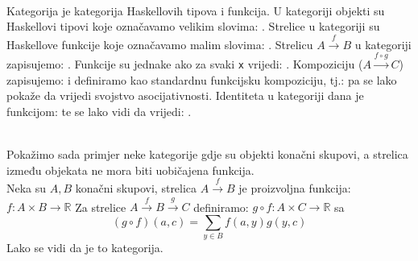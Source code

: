 	\begin{example}\ \\
	
  \noindent Kategorija  je kategorija Haskellovih tipova i funkcija. U
  kategoriji  objekti su Haskellovi tipovi koje označavamo velikim
  slovima:
  .
  Strelice u kategoriji  su Haskellove funkcije koje označavamo malim
  slovima:
  .
  Strelicu $A \xrightarrow{f} B$ u kategoriji  zapisujemo:
  .
  Funkcije
  su jednake ako za svaki \texttt{x} vrijedi:
    .
  Kompoziciju ($A \xrightarrow{f \circ g} C$) zapisujemo:
    i definiramo kao standardnu funkcijsku kompoziciju, tj.:
  pa se lako pokaže da vrijedi svojstvo asocijativnosti.
  Identiteta u kategoriji  dana je funkcijom:
  te se lako vidi da vrijedi:
    .\\
  \end{example}

	\begin{example}\ \\
	
    \noindent Pokažimo sada primjer neke kategorije  gdje su objekti konačni skupovi,
    a strelica između objekata ne mora biti uobičajena funkcija.\\
    Neka su $A, B$ konačni skupovi, strelica $A \xrightarrow{f} B$ je
    proizvoljna funkcija: $f:A \times B \rightarrow \mathbb{R}$
    Za strelice $A \xrightarrow{f} B \xrightarrow{g} C$ definiramo: $g \circ f:A \times C \rightarrow \mathbb{R}$
    sa
    \begin{equation*}
      (g \circ f)(a, c) = \sum_{y \in B}f(a, y)g(y,c)
    \end{equation*}
    Lako se vidi da je to kategorija.\\
\end{example}

